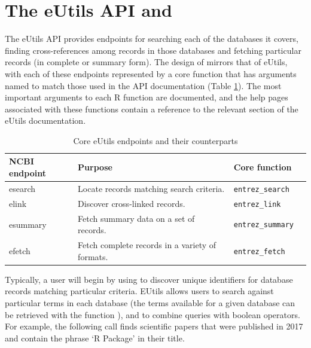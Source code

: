 \section{The eUtils API and  }

The eUtils API provides endpoints for searching each of the databases it covers, 
finding cross-references among records in those databases and fetching 
particular records (in complete or summary form). The design of  
mirrors that of eUtils, with each of these endpoints represented by a core
function that has arguments named to match those used in the API documentation
(Table \ref{tab:core-ends}). The most important arguments to each R function are
documented, and the help pages associated with these functions contain a reference 
to the relevant section of the eUtils documentation.

\begin{table}[h]%
\centering      %
\caption{Core eUtils endpoints and their  counterparts}
\label{tab:core-ends}
\begin{tabular}{llll}
\hline
NCBI endpoint & Purpose                                         & Core function            \\ \hline
esearch       & Locate records matching search criteria.        & \texttt{entrez\_search}  \\
elink         & Discover cross-linked records.                  & \texttt{entrez\_link}    \\ 
esummary      & Fetch summary data on a set of records.         & \texttt{entrez\_summary} \\ 
efetch        & Fetch complete records in a variety of formats. & \texttt{entrez\_fetch}   \\ \hline
\end{tabular}
\end{table}


Typically, a user will begin by using  to discover unique
identifiers for database records matching particular criteria. EUtils allows
users to search against particular terms in each database (the terms available
for a given database can be retrieved with the function
), and to combine queries with boolean operators. 
For example, the following call finds scientific papers that were published in 2017 
and contain the phrase `R Package' in their title.

